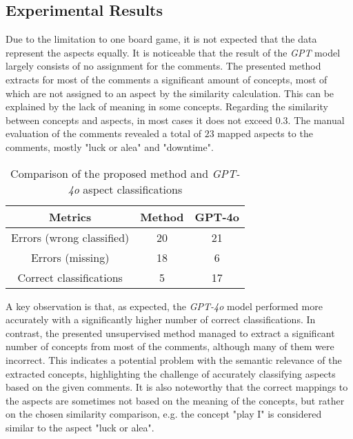 \documentclass[sn-mathphys-num]{sn-jnl}%
\theoremstyle{thmstyleone}%
\theoremstyle{thmstyletwo}%
\theoremstyle{thmstylethree}%
\begin{document}
    \subsection{Experimental Results}
    Due to the limitation to one board game, it is not expected that the data represent the aspects equally. It is noticeable that the result of the \textit{GPT} model largely consists of no assignment for the comments. The presented method extracts for most of the comments a significant amount of concepts, most of which are not assigned to an aspect by the similarity calculation. This can be explained by the lack of meaning in some concepts. Regarding the similarity between concepts and aspects, in most cases it does not exceed $0.3$. The manual evaluation of the comments revealed a total of $23$ mapped aspects to the comments, mostly "luck or alea" and "downtime".
    \begin{table}[h!]
        \centering
        \begin{tabular}{|c|c|c|}
        \hline
        \textbf{Metrics} & \textbf{Method} & \textbf{GPT-4o} \\ \hline
        Errors (wrong classified) & 20 & 21 \\ \hline
        Errors (missing) & 18 & 6 \\ \hline
        Correct classifications & 5 & 17 \\ \hline
        \end{tabular}
        \caption{Comparison of the proposed method and \textit{GPT-4o} aspect classifications}
        \label{table:1}
    \end{table}
    A key observation is that, as expected, the \textit{GPT-4o} model performed more accurately with a significantly higher number of correct classifications. In contrast, the presented unsupervised method managed to extract a significant number of concepts from most of the comments, although many of them were incorrect. This indicates a potential problem with the semantic relevance of the extracted concepts, highlighting the challenge of accurately classifying aspects based on the given comments. It is also noteworthy that the correct mappings to the aspects are sometimes not based on the meaning of the concepts, but rather on the chosen similarity comparison, e.g. the concept "play I" is considered similar to the aspect "luck or alea".
        
\end{document}
